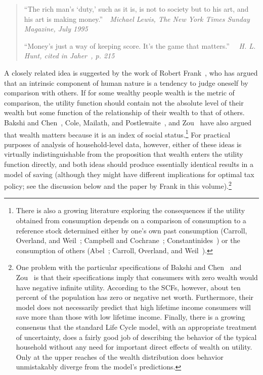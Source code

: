 \documentclass[titlepage,12pt]{article}
\begin{document}
\begin{quote}
``The rich man's `duty,' such as it is, is not to society but to his art, and 
his art is making money.''~~\emph{Michael Lewis, {\it The New York Times 
Sunday Magazine, July 1995}}

``Money's just a way of keeping score.  It's the game that matters.''
~~\emph{H. L. Hunt, cited in Jaher~\cite{jaher:gilded}, p. 215}
\end{quote}

A closely related idea is suggested by the work of Robert 
Frank~\cite{frank:rightpond}, who has argued that an intrinsic 
component of human nature is a tendency to judge oneself by comparison 
with others.  If for some wealthy people wealth is the metric of 
comparison, the utility function should contain not the absolute level 
of their wealth but some function of the relationship of their wealth 
to that of others.  Bakshi and Chen~\cite{bakshi&chen:spirit}, Cole, 
Mailath, and Postlewaite~\cite{cmp:socialnorms}, and 
Zou~\cite{zou:spirit} have also argued that wealth matters because it 
is an index of social status.\footnote{There is also a growing 
literature exploring the consequences if the utility obtained from 
consumption depends on a comparison of consumption to a reference 
stock determined either by one's own past consumption (Carroll, 
Overland, and Weil~\cite{cow:habits}; Campbell and 
Cochrane~\cite{campbell&cochrane:force}; 
Constantinides~\cite{constantinidesHabits}) or the consumption of 
others (Abel~\cite{abel:aerhabits}; Carroll, Overland, and 
Weil~\cite{cow:envy}).} For practical purposes of analysis of 
household-level data, however, either of these ideas is virtually 
indistinguishable from the proposition that wealth enters the utility 
function directly, and both ideas should produce essentially identical 
results in a model of saving (although they might have different 
implications for optimal tax policy; see the discussion below and the 
paper by Frank in this volume).\footnote{One problem with the 
particular specifications of Bakshi and Chen~\cite{bakshi&chen:spirit} 
and Zou~\cite{zou:spirit} is that their specifications imply that 
consumers with zero wealth would have negative infinite utility.  
According to the SCFs, however, about ten percent of the population 
has zero or negative net worth.  Furthermore, their model does not 
necessarily predict that high lifetime income consumers will save more 
than those with low lifetime income.  Finally, there is a growing 
consensus that the standard Life Cycle model, with an appropriate 
treatment of uncertainty, does a fairly good job of describing the 
behavior of the typical household without any need for important 
direct effects of wealth on utility.  Only at the upper reaches of the 
wealth distribution does behavior unmistakably diverge from the 
model's predictions.}
\end{document}
